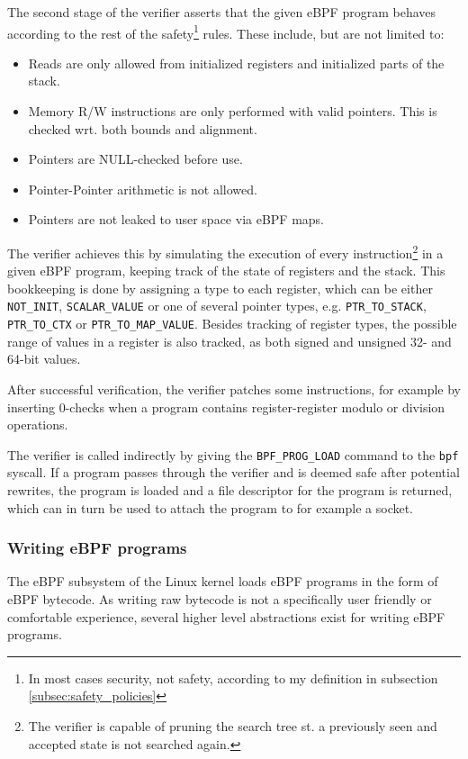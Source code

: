 The second stage of the verifier asserts that the given eBPF program behaves according to the rest of the safety\footnote{In most cases security, not safety, according to my definition in subsection \ref{subsec:safety_policies}} rules. These include, but are not limited to:
\begin{itemize}
\item Reads are only allowed from initialized registers and initialized parts of the stack. 
\item Memory R/W instructions are only performed with valid pointers. This is checked wrt. both bounds and alignment.
\item Pointers are NULL-checked before use. 
\item Pointer-Pointer arithmetic is not allowed.
  \item Pointers are not leaked to user space via eBPF maps. 
\end{itemize}

The verifier achieves this by simulating the execution of every instruction\footnote{The verifier is capable of pruning the search tree st. a previously seen and accepted state is not searched again.} in a given eBPF program, keeping track of the state of registers and the stack. This bookkeeping is done by assigning a type to each register, which can be either \texttt{NOT\_INIT}, \texttt{SCALAR\_VALUE} or one of several pointer types, e.g. \texttt{PTR\_TO\_STACK}, \texttt{PTR\_TO\_CTX} or \texttt{PTR\_TO\_MAP\_VALUE}.
Besides tracking of register types, the possible range of values in a register is also tracked, as both signed and unsigned 32- and 64-bit values.


After successful verification, the verifier patches some instructions, for example by inserting 0-checks when a program contains register-register modulo or division operations.


The verifier is called indirectly by giving the \verb!BPF_PROG_LOAD! command to the \verb!bpf! syscall. 
If a program passes through the verifier and is deemed safe after potential rewrites, the program is loaded and a file descriptor for the program is returned, which can in turn be used to attach the program to for example a socket. 



\subsubsection*{Writing eBPF programs}
The eBPF subsystem of the Linux kernel loads eBPF programs in the form of eBPF bytecode. As writing raw bytecode is not a specifically user friendly or comfortable experience, several higher level abstractions exist for writing eBPF programs. 

